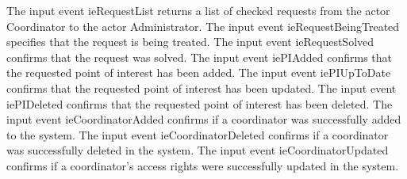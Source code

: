\begin{actortable}
							 {The input event ieRequestList returns a list of checked requests from the actor Coordinator 
							 to the actor Administrator.}
							 {The input event ieRequestBeingTreated specifies that the request is being treated.}
							 {The input event ieRequestSolved confirms that the request was solved.}
							 {The input event iePIAdded confirms that the requested point of interest has been added.}
							 {The input event iePIUpToDate confirms that the requested point of interest has been updated.}
							 {The input event iePIDeleted confirms that the requested point of interest has been deleted.}
							 {The input event ieCoordinatorAdded confirms if a coordinator was successfully added to the system.}
							 {The input event ieCoordinatorDeleted confirms if a coordinator was successfully deleted in the system.}
							 {The input event ieCoordinatorUpdated confirms if a coordinator's access rights were successfully updated in the system.}
	
\end{actortable}

